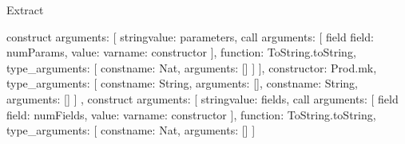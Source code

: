 \begin{lexlean}{Extract}
\begin{toolingmodule}
{{{{{{{{{{{{{{{{                                                    construct{
                                                      arguments: [
                                                        string{value: parameters},
                                                        call{
                                                          arguments: [
                                                            field{
                                                              field: numParams,
                                                              value: var{name: constructor}
                                                            }
                                                          ],
                                                          function: ToString.toString,
                                                          type_arguments: [
                                                            const{name: Nat, arguments: []}
                                                          ]
                                                        }
                                                      ],
                                                      constructor: Prod.mk,
                                                      type_arguments: [
                                                        const{name: String, arguments: []},
                                                        const{name: String, arguments: []}
                                                      ]
                                                    },
                                                    construct{
                                                      arguments: [
                                                        string{value: fields},
                                                        call{
                                                          arguments: [
                                                            field{
                                                              field: numFields,
                                                              value: var{name: constructor}
                                                            }
                                                          ],
                                                          function: ToString.toString,
                                                          type_arguments: [
                                                            const{name: Nat, arguments: []}
                                                          ]
                                                        }
}}}}}}}}}}}}}}}}}
\end{toolingmodule}
\end{lexlean}
